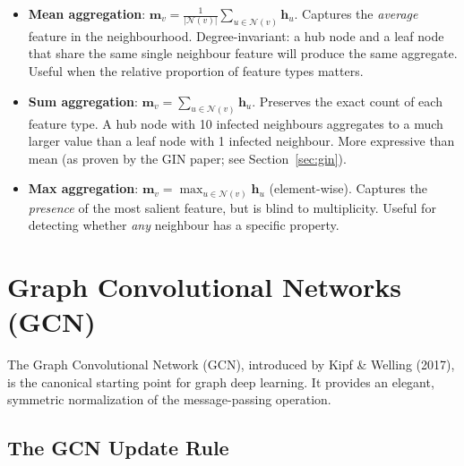 \begin{itemize}
    \item \textbf{Mean aggregation}: $\mathbf{m}_v = \frac{1}{|\mathcal{N}(v)|}\sum_{u \in \mathcal{N}(v)} \mathbf{h}_u$. Captures the \emph{average} feature in the neighbourhood. Degree-invariant: a hub node and a leaf node that share the same single neighbour feature will produce the same aggregate. Useful when the relative proportion of feature types matters.
    \item \textbf{Sum aggregation}: $\mathbf{m}_v = \sum_{u \in \mathcal{N}(v)} \mathbf{h}_u$. Preserves the exact count of each feature type. A hub node with 10 infected neighbours aggregates to a much larger value than a leaf node with 1 infected neighbour. More expressive than mean (as proven by the GIN paper; see Section~\ref{sec:gin}).
    \item \textbf{Max aggregation}: $\mathbf{m}_v = \max_{u \in \mathcal{N}(v)} \mathbf{h}_u$ (element-wise). Captures the \emph{presence} of the most salient feature, but is blind to multiplicity. Useful for detecting whether \emph{any} neighbour has a specific property.
\end{itemize}

\section{Graph Convolutional Networks (GCN)}

The Graph Convolutional Network (GCN), introduced by Kipf \& Welling (2017), is the canonical starting point for graph deep learning. It provides an elegant, symmetric normalization of the message-passing operation.

\subsection{The GCN Update Rule}

